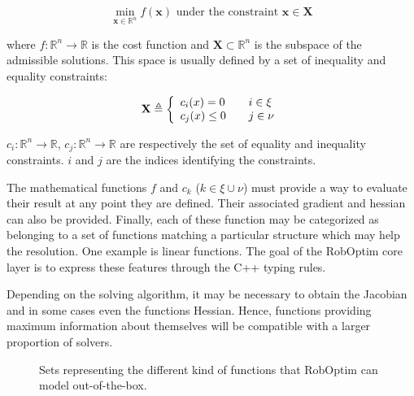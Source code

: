 \documentclass[conference,final,a4paper,twocolumn,9pt]{IEEEtran}
\begin{document}
\begin{equation}\label{eq:optimization}
  \min_{\mathbf{x} \in \mathbb{R}^n} f(\mathbf{x}) \text{ under the constraint } \mathbf{x} \in \mathbf{X}
\end{equation}

where $f : \mathbb{R}^n \rightarrow \mathbb{R}$ is the cost function
and $\mathbf{X} \subset \mathbb{R}^n$ is the subspace of the
admissible solutions. This space is usually defined by a set of
inequality and equality constraints:

\begin{equation}
  \mathbf{X} \triangleq \left\{
  \begin{array}{l l}
    c_i (x) = 0    & \quad i \in \xi \\
    c_j (x) \leq 0 & \quad j \in \nu \\
  \end{array} \right.
\end{equation}

$c_i : \mathbb{R}^n \rightarrow \mathbb{R}$, $c_j : \mathbb{R}^n
\rightarrow \mathbb{R}$ are respectively the set of equality and
inequality constraints. $i$ and $j$ are the indices identifying the
constraints.

The mathematical functions $f$ and $c_k$ ($k \in \xi \cup \nu$) must
provide a way to evaluate their result at any point they are
defined. Their associated gradient and hessian can also be
provided. Finally, each of these function may be categorized as
belonging to a set of functions matching a particular structure which
may help the resolution. One example is linear functions. The goal of
the RobOptim core layer is to express these features through the C++
typing rules.


Depending on the solving algorithm, it may be necessary to obtain the
Jacobian and in some cases even the functions Hessian. Hence,
functions providing maximum information about themselves will be
compatible with a larger proportion of solvers.

\begin{figure}[ht!]
  \begin{center}
  \end{center}
  \caption{Sets representing the different kind of functions that
    RobOptim can model out-of-the-box.}\label{fig:functions}
\end{figure}
\end{document}
